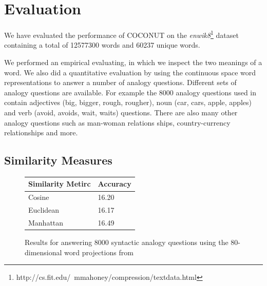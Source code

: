 \documentclass[11pt]{article}
\begin{document}

\section{Evaluation}
We have evaluated the performance of COCONUT on the \textit{enwik8}\footnote{http://cs.fit.edu/~mmahoney/compression/textdata.html} dataset containing a total of 12577300 words and 60237 unique words. 

We performed an empirical evaluating, in which we inspect the two meanings of a word. We also did a quantitative evaluation by using the continuous space word representations to answer a number of analogy questions. Different sets of analogy questions are available. For example the 8000 analogy questions used in \cite{Mikolov:13} contain adjectives (big, bigger, rough, rougher), noun (car, cars, apple, apples) and verb (avoid, avoids, wait, waits) questions. There are also many other analogy questions such as man-woman relations ships, country-currency relationships and more.

\subsection{Similarity Measures}
\begin{figure}
\center
    \begin{tabular}{l|l}
    Similarity Metirc & Accuracy  \\ \hline
    Cosine            & 16.20     \\ \hline
    Euclidean         & 16.17     \\ \hline
    Manhattan         & 16.49     \\
    \end{tabular}
    \caption{Results for answering 8000 syntactic analogy questions using the 80-dimensional word projections from \cite{Mikolov:13}}
    \label{sims}

\end{figure}
\end{document}
